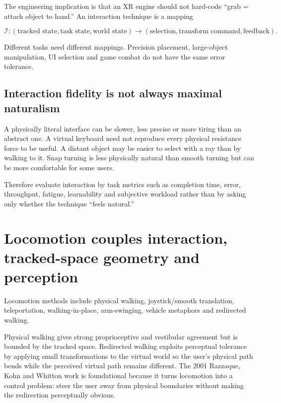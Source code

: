 The engineering implication is that an XR engine should not hard-code ``grab = attach object to hand.'' An interaction technique is a mapping

\[
\mathcal I:
(\text{tracked state},\text{task state},\text{world state})
\rightarrow
(\text{selection},\text{transform command},\text{feedback}).
\]

Different tasks need different mappings. Precision placement, large-object manipulation, UI selection and game combat do not have the same error tolerance.

\subsection{Interaction fidelity is not always maximal naturalism}\label{04-visual-computing-ii-ch035-interaction-fidelity-is-not-always-maximal-naturalism}

A physically literal interface can be slower, less precise or more tiring than an abstract one. A virtual keyboard need not reproduce every physical resistance force to be useful. A distant object may be easier to select with a ray than by walking to it. Snap turning is less physically natural than smooth turning but can be more comfortable for some users.

Therefore evaluate interaction by task metrics such as completion time, error, throughput, fatigue, learnability and subjective workload rather than by asking only whether the technique ``feels natural.''

\section{Locomotion couples interaction, tracked-space geometry and perception}\label{04-visual-computing-ii-ch035-locomotion-couples-interaction-tracked-space-geometry-and-perception}

Locomotion methods include physical walking, joystick/smooth translation, teleportation, walking-in-place, arm-swinging, vehicle metaphors and redirected walking.

Physical walking gives strong proprioceptive and vestibular agreement but is bounded by the tracked space. Redirected walking exploits perceptual tolerance by applying small transformations to the virtual world so the user's physical path bends while the perceived virtual path remains different. The 2001 Razzaque, Kohn and Whitton work is foundational because it turns locomotion into a control problem: steer the user away from physical boundaries without making the redirection perceptually obvious.

